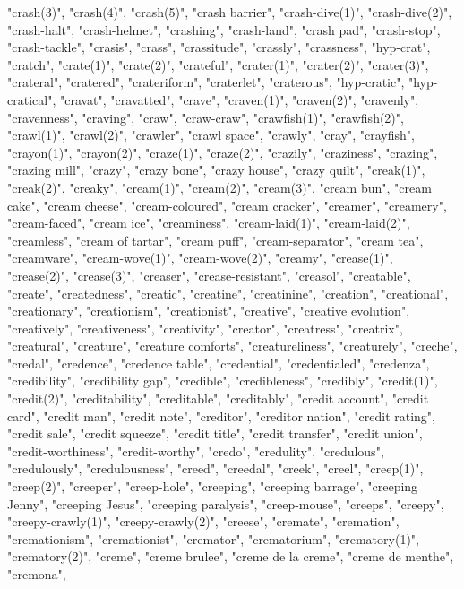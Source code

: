 "crash(3)",
"crash(4)",
"crash(5)",
"crash barrier",
"crash-dive(1)",
"crash-dive(2)",
"crash-halt",
"crash-helmet",
"crashing",
"crash-land",
"crash pad",
"crash-stop",
"crash-tackle",
"crasis",
"crass",
"crassitude",
"crassly",
"crassness",
"hyp-crat",
"cratch",
"crate(1)",
"crate(2)",
"crateful",
"crater(1)",
"crater(2)",
"crater(3)",
"crateral",
"cratered",
"crateriform",
"craterlet",
"craterous",
"hyp-cratic",
"hyp-cratical",
"cravat",
"cravatted",
"crave",
"craven(1)",
"craven(2)",
"cravenly",
"cravenness",
"craving",
"craw",
"craw-craw",
"crawfish(1)",
"crawfish(2)",
"crawl(1)",
"crawl(2)",
"crawler",
"crawl space",
"crawly",
"cray",
"crayfish",
"crayon(1)",
"crayon(2)",
"craze(1)",
"craze(2)",
"crazily",
"craziness",
"crazing",
"crazing mill",
"crazy",
"crazy bone",
"crazy house",
"crazy quilt",
"creak(1)",
"creak(2)",
"creaky",
"cream(1)",
"cream(2)",
"cream(3)",
"cream bun",
"cream cake",
"cream cheese",
"cream-coloured",
"cream cracker",
"creamer",
"creamery",
"cream-faced",
"cream ice",
"creaminess",
"cream-laid(1)",
"cream-laid(2)",
"creamless",
"cream of tartar",
"cream puff",
"cream-separator",
"cream tea",
"creamware",
"cream-wove(1)",
"cream-wove(2)",
"creamy",
"crease(1)",
"crease(2)",
"crease(3)",
"creaser",
"crease-resistant",
"creasol",
"creatable",
"create",
"createdness",
"creatic",
"creatine",
"creatinine",
"creation",
"creational",
"creationary",
"creationism",
"creationist",
"creative",
"creative evolution",
"creatively",
"creativeness",
"creativity",
"creator",
"creatress",
"creatrix",
"creatural",
"creature",
"creature comforts",
"creatureliness",
"creaturely",
"creche",
"credal",
"credence",
"credence table",
"credential",
"credentialed",
"credenza",
"credibility",
"credibility gap",
"credible",
"credibleness",
"credibly",
"credit(1)",
"credit(2)",
"creditability",
"creditable",
"creditably",
"credit account",
"credit card",
"credit man",
"credit note",
"creditor",
"creditor nation",
"credit rating",
"credit sale",
"credit squeeze",
"credit title",
"credit transfer",
"credit union",
"credit-worthiness",
"credit-worthy",
"credo",
"credulity",
"credulous",
"credulously",
"credulousness",
"creed",
"creedal",
"creek",
"creel",
"creep(1)",
"creep(2)",
"creeper",
"creep-hole",
"creeping",
"creeping barrage",
"creeping Jenny",
"creeping Jesus",
"creeping paralysis",
"creep-mouse",
"creeps",
"creepy",
"creepy-crawly(1)",
"creepy-crawly(2)",
"creese",
"cremate",
"cremation",
"cremationism",
"cremationist",
"cremator",
"crematorium",
"crematory(1)",
"crematory(2)",
"creme",
"creme brulee",
"creme de la creme",
"creme de menthe",
"cremona",
